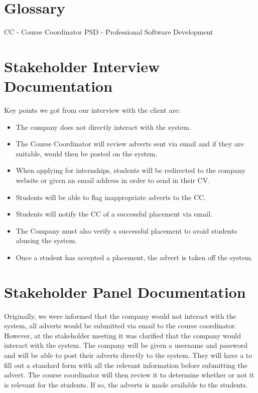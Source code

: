\documentclass{l3deliverable}
\begin{document}
\section{Glossary}
CC - Course Coordinator
PSD - Professional Software Development

\section{Stakeholder Interview Documentation}

Key points we got from our interview with the client are:

\begin{itemize}
\item The company does not directly interact with the system.
\item The Course Coordinator will review adverts sent via email and if they are suitable, would
then be posted on the system.
\item When applying for internships, students will be redirected to the company website or given
an email address in order to send in their CV.
\item Students will be able to flag inappropriate adverts to the CC.
\item Students will notify the CC of a successful placement via email.
\item The Company must also verify a successful placement to avoid students abusing the
system.
\item Once a student has accepted a placement, the advert is taken off the system.
\end{itemize}

\section{Stakeholder Panel Documentation}

Originally, we were informed that the company would not interact with the system, all adverts
would be submitted via email to the course coordinator. However, at the stakeholder meeting
it was clarified that the company would interact with the system. The company will be given a
username and password and will be able to post their adverts directly to the system. They will
have a to fill out a standard form with all the relevant information before submitting the advert.
The course coordinator will then review it to determine whether or not it is relevant for the
students. If so, the adverts is made available to the students.
\end{document}
